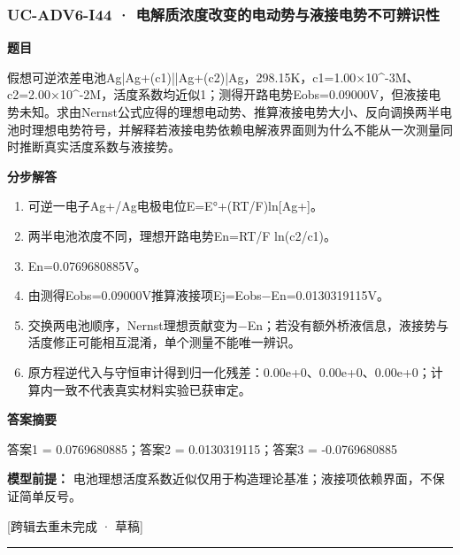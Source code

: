 \documentclass[UTF8,11pt,a4paper]{ctexart}
\begin{document}
\subsubsection*{UC-ADV6-I44 · 电解质浓度改变的电动势与液接电势不可辨识性}
\noindent\textbf{题目}\par
假想可逆浓差电池Ag|Ag+(c1)||Ag+(c2)|Ag，298.15K，c1=1.00×10\textasciicircum{}-3M、c2=2.00×10\textasciicircum{}-2M，活度系数均近似1；测得开路电势Eobs=0.09000V，但液接电势未知。求由Nernst公式应得的理想电动势、推算液接电势大小、反向调换两半电池时理想电势符号，并解释若液接电势依赖电解液界面则为什么不能从一次测量同时推断真实活度系数与液接势。\par
\medskip\noindent\textbf{分步解答}
\begin{enumerate}
\item 可逆一电子Ag+/Ag电极电位E=E°+(RT/F)ln[Ag+]。
\item 两半电池浓度不同，理想开路电势En=RT/F ln(c2/c1)。
\item En=0.0769680885V。
\item 由测得Eobs=0.09000V推算液接项Ej=Eobs−En=0.0130319115V。
\item 交换两电池顺序，Nernst理想贡献变为−En；若没有额外桥液信息，液接势与活度修正可能相互混淆，单个测量不能唯一辨识。
\item 原方程逆代入与守恒审计得到归一化残差：0.00e+0、0.00e+0、0.00e+0；计算内一致不代表真实材料实验已获审定。
\end{enumerate}
\noindent\textbf{答案摘要}\par
答案1 = 0.0769680885；答案2 = 0.0130319115；答案3 = -0.0769680885\par
\noindent\textbf{模型前提：}
电池理想活度系数近似仅用于构造理论基准；液接项依赖界面，不保证简单反号。\par
\noindent\textcolor{red!65!black}{[跨辑去重未完成 · 草稿]} \par
\medskip\hrule\medskip
{}
\end{document}
